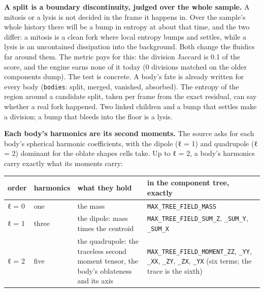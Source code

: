 \textbf{A split is a boundary discontinuity, judged over the whole sample.} A mitosis or a lysis is not decided in the frame it happens in. Over the sample's whole history there will be a bump in entropy at about that time, and the two differ: a mitosis is a clean fork where local entropy bumps and settles, while a lysis is an uncontained dissipation into the background. Both change the fluidics far around them. The metric pays for this: the division Jaccard is 0.1 of the score, and the engine earns none of it today (0 divisions matched on the older components dump). The test is concrete. A body's fate is already written for every body (\texttt{bodies}: split, merged, vanished, absorbed). The entropy of the region around a candidate split, taken per frame from the exact residual, can say whether a real fork happened. Two linked children and a bump that settles make a division; a bump that bleeds into the floor is a lysis.

\textbf{Each body's harmonics are its second moments.} The source asks for each body's spherical harmonic coefficients, with the dipole (ℓ = 1) and quadrupole (ℓ = 2) dominant for the oblate shapes cells take. Up to ℓ = 2, a body's harmonics carry exactly what its moments carry:

{\footnotesize
\setlength{\tabcolsep}{6pt}
\begin{longtable}{>{\RaggedRight\arraybackslash}p{}>{\RaggedRight\arraybackslash}p{}>{\RaggedRight\arraybackslash}p{}>{\RaggedRight\arraybackslash}p{}}
\toprule
order & harmonics & what they hold & in the component tree, exactly \\
\midrule
\endhead
ℓ = 0 & one & the mass & \texttt{MAX\_\allowbreak{}TREE\_\allowbreak{}FIELD\_\allowbreak{}MASS} \\
ℓ = 1 & three & the dipole: mass times the centroid & \texttt{MAX\_\allowbreak{}TREE\_\allowbreak{}FIELD\_\allowbreak{}SUM\_\allowbreak{}Z}, \texttt{\_\allowbreak{}SUM\_\allowbreak{}Y}, \texttt{\_\allowbreak{}SUM\_\allowbreak{}X} \\
ℓ = 2 & five & the quadrupole: the traceless second moment tensor, the body's oblateness and its axis & \texttt{MAX\_\allowbreak{}TREE\_\allowbreak{}FIELD\_\allowbreak{}MOMENT\_\allowbreak{}ZZ}, \texttt{\_\allowbreak{}YY}, \texttt{\_\allowbreak{}XX}, \texttt{\_\allowbreak{}ZY}, \texttt{\_\allowbreak{}ZX}, \texttt{\_\allowbreak{}YX} (six terms; the trace is the sixth) \\
\bottomrule
\end{longtable}
}

